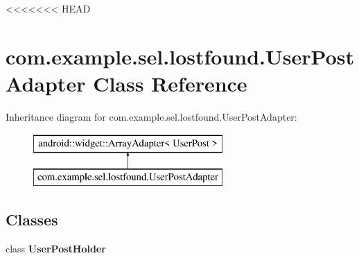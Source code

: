 <<<<<<< HEAD
\hypertarget{classcom_1_1example_1_1sel_1_1lostfound_1_1UserPostAdapter}{\section{com.\-example.\-sel.\-lostfound.\-User\-Post\-Adapter Class Reference}
\label{classcom_1_1example_1_1sel_1_1lostfound_1_1UserPostAdapter}
}
Inheritance diagram for com.\-example.\-sel.\-lostfound.\-User\-Post\-Adapter\-:\begin{figure}[H]
\begin{center}
\leavevmode
\includegraphics[height=2.000000cm]{classcom_1_1example_1_1sel_1_1lostfound_1_1UserPostAdapter}
\end{center}
\end{figure}
\subsection*{Classes}
\begin{DoxyCompactItemize}
\item 
class {\bfseries User\-Post\-Holder}
\end{DoxyCompactItemize}
